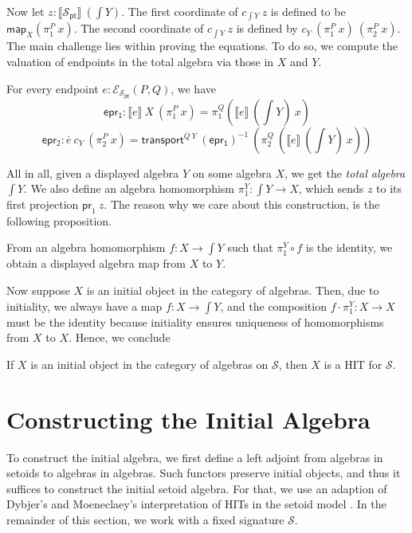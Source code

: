\documentclass[9pt]{entcs}
\newcommand{\term}[1]{\mathsf{#1}}
\newcommand{\function}[1]{\mathsf{#1}}
\newcommand{\0}{\textbf{0}} %
\newcommand{\1}{\textbf{1}} %
\newcommand{\prl}{\term{pr}_1} %
\newcommand{\transport}[2]{\function{transport}^{#1} \> #2} %
\newcommand{\invP}[1]{(#1)^{-1}} %
\newcommand{\compm}[2]{#2 \circ #1} %
\newcommand{\ep}[3]{\mathcal{E}_{#1}(#2,#3)} %
\newcommand{\comp}[2]{#1 \cdot #2} %
\newcommand{\pt}[0]{\textsf{pt}}
\newcommand{\pointc}[1]{#1_{\pt}} %
\newcommand{\sig}{\mathcal{S}} %
\newcommand{\semP}[1]{\llbracket #1 \rrbracket} %
\newcommand{\semE}[1]{\llbracket #1 \rrbracket} %
\newcommand{\constrA}[1]{\function{map}_{#1}} %
\newcommand{\polydact}[2]{\overline{#1} \> #2} %
\newcommand{\epdact}[2]{\overline{#1} \> #2} %
\newcommand{\total}[1]{\int #1} %
\newcommand{\proj}[1]{\pi_1^{#1}} %
\newcommand{\Ppl}[1]{\pi_1^{#1}} %
\newcommand{\Ppr}[1]{\pi_2^{#1}} %
\newcommand{\Epl}{\function{epr_1}} %
\newcommand{\Epr}{\function{epr_2}} %
\begin{document}
Now let $z : \semP{\pointc{\sig}} \> (\total{Y})$.
The first coordinate of $c_{\total{Y}} \> z$ is defined to be $\constrA{X}(\Ppl{P} \> x)$.
The second coordinate of $c_{\total{Y}} \> z$ is defined by $c_Y \> (\Ppl{P} \> x) \> (\Ppr{P} \> x)$.
The main challenge lies within proving the equations.
To do so, we compute the valuation of endpoints in the total algebra via those in $X$ and $Y$.

\begin{lemma}
For every endpoint $e : \ep{\pointc{\sig}}{P}{Q}$, we have
\[
\Epl : \semE{e} \> X \> (\Ppl{P} \> x) = \Ppl{Q}(\semE{e} \> (\total{Y}) \> x) 
\]
\[
\Epr : \epdact{e}{c_Y} \> (\Ppr{P} \> x) = \transport{\polydact{Q}{Y}}{\invP{\Epl}} \> (\Ppr{Q} \> (\semE{e} \> (\total{Y}) \> x))
\]
\end{lemma}

All in all, given a displayed algebra $Y$ on some algebra $X$, we get the \emph{total algebra} $\total{Y}$.
We also define an algebra homomorphism $\proj{Y} : \total{Y} \rightarrow X$, which sends $z$ to its first projection $\prl \> z$.
The reason why we care about this construction, is the following proposition.

\begin{proposition}
From an algebra homomorphism $f : X \rightarrow \total{Y}$ such that $\compm{f}{\proj{Y}}$ is the identity, we obtain a displayed algebra map from $X$ to $Y$.
\end{proposition}

Now suppose $X$ is an initial object in the category of algebras.
Then, due to initiality, we always have a map $f : X \rightarrow \total{Y}$, and the composition $\comp{f}{\proj{Y}} : X \rightarrow X$ must be the identity because initiality ensures uniqueness of homomorphisms from $X$ to $X$.
Hence, we conclude

\begin{corollary}
If $X$ is an initial object in the category of algebras on $\sig$, then $X$ is a HIT for $\sig$.
\end{corollary}

\section{Constructing the Initial Algebra}
\label{sec:construction}
To construct the initial algebra, we first define a left adjoint from algebras in setoids to algebras in algebras.
Such functors preserve initial objects, and thus it suffices to construct the initial setoid algebra.
For that, we use an adaption of Dybjer's and Moeneclaey's interpretation of HITs in the setoid model \cite{DybjerM18,moeneclaey2016schema}.
In the remainder of this section, we work with a fixed signature $\sig$.
\end{document}
